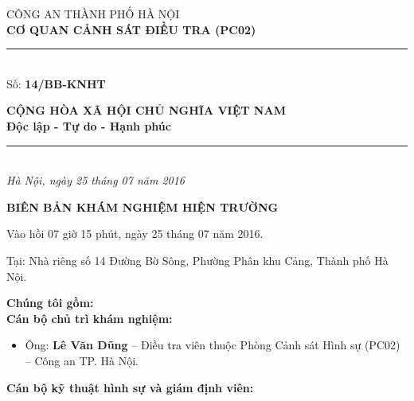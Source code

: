 \documentclass[12pt,a4paper]{article}
\begin{document}
\noindent
\begin{minipage}[t]{0.46\textwidth}
    \begin{center}
        \fontsize{11pt}{13pt}\selectfont
        CÔNG AN THÀNH PHỐ HÀ NỘI\\
        \textbf{CƠ QUAN CẢNH SÁT ĐIỀU TRA (PC02)}\\[-0.2em]
        \rule{3.2cm}{0.6pt}\\[0.25cm]
        \fontsize{11pt}{13pt}\selectfont Số: \textbf{14/BB-KNHT}
    \end{center}
\end{minipage}
\hfill
\begin{minipage}[t]{0.52\textwidth}
    \begin{center}
        \fontsize{11pt}{13pt}\selectfont
        \textbf{CỘNG HÒA XÃ HỘI CHỦ NGHĨA VIỆT NAM}\\
        \textbf{Độc lập - Tự do - Hạnh phúc}\\[-0.2em]
        \rule{3.6cm}{0.6pt}\\[0.25cm]
        \textit{Hà Nội, ngày 25 tháng 07 năm 2016}
    \end{center}
\end{minipage}

\vspace{0.5cm}

\begin{center}
    \textbf{\Large BIÊN BẢN KHÁM NGHIỆM HIỆN TRƯỜNG}\\[0.15cm]
    \textit{}
\end{center}

\vspace{0.3cm}

Vào hồi 07 giờ 15 phút, ngày 25 tháng 07 năm 2016.

Tại: Nhà riêng số 14 Đường Bờ Sông, Phường Phân khu Cảng, Thành phố Hà Nội.



\vspace{0.3cm}\noindent\textbf{\large Chúng tôi gồm:}\\[0.15cm]


\textbf{Cán bộ chủ trì khám nghiệm:}

\begin{itemize}[leftmargin=*, itemsep=2pt, topsep=2pt, parsep=0pt]
  \item Ông: \textbf{Lê Văn Dũng} – Điều tra viên thuộc Phòng Cảnh sát Hình sự (PC02) – Công an TP. Hà Nội.

\end{itemize}
\textbf{Cán bộ kỹ thuật hình sự và giám định viên:}
\end{document}
